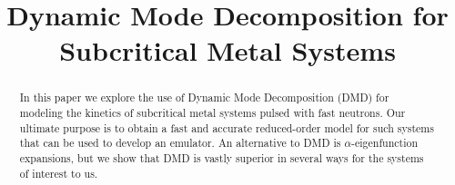 \documentclass{style/nseJournal}
\begin{document}
\title{Dynamic Mode Decomposition for Subcritical Metal Systems} %

{}
{}

{}


\titlePage

\begin{abstract}
In this paper we explore the use of Dynamic Mode Decomposition (DMD) for modeling the kinetics of subcritical metal systems pulsed with fast neutrons.  
Our ultimate purpose is to obtain a fast and accurate reduced-order model for such systems that can be used to develop an emulator.  
An alternative to DMD is $\alpha$-eigenfunction expansions, but we show that DMD is vastly superior in several ways for the systems of interest to us.  
\end{abstract}
\end{document}
